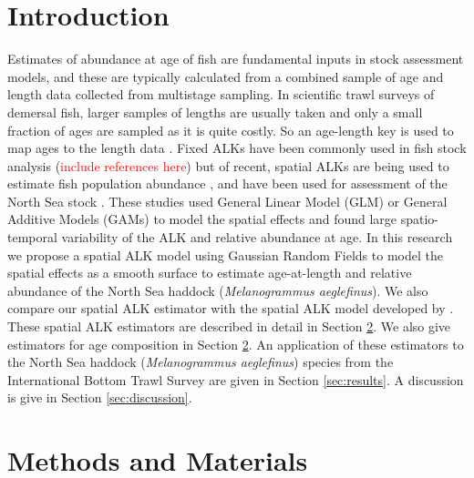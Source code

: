\documentclass[a4paper 12pt]{article}
\numberwithin{equation}{section}
\newcommand{\ed}[1]{\textcolor{red}{#1}}
\begin{document}
\section{ Introduction}
Estimates of abundance at age of fish are fundamental inputs in stock assessment models, and these are typically calculated from a combined sample of age and length data collected from multistage sampling. In scientific trawl surveys of demersal fish, larger samples of lengths are usually taken and only a small fraction of ages are sampled as it is quite costly. So an age-length key is used to map ages to the length data \citep{aanes2015efficient, fridriksson1934calculation}. Fixed ALKs have  been commonly used in fish stock analysis (\ed{include references here}) but of recent, spatial ALKs are being used to estimate fish population abundance \citep{berg2012spatial, hirst2012bayesian, rindorf2001analyses}, and have been used for assessment of the North Sea stock \citep{berg2014evaluation, gerritsen2006simple}. These studies used  General Linear Model (GLM) or General Additive Models (GAMs) to model the spatial effects and found large spatio-temporal variability of the ALK and relative abundance at age. In this research  we propose a spatial ALK model using Gaussian Random Fields to model the spatial effects as a smooth surface to estimate age-at-length and relative abundance of the North Sea haddock (\textit{Melanogrammus aeglefinus}). We also compare our spatial ALK estimator with the spatial ALK model developed by \citep{berg2012spatial}. These spatial ALK estimators are described in detail in Section \ref{sec:methods}. We also give estimators for age composition in Section \ref{sec:methods}. An application of these estimators to the North Sea  haddock (\textit{Melanogrammus aeglefinus}) species from the International Bottom Trawl Survey are given in Section \ref{sec:results}. A discussion is give in Section \ref{sec:discussion}.


\section{Methods and Materials}
\label{sec:methods}
\end{document}
